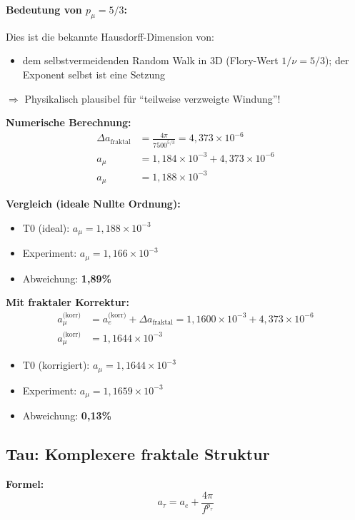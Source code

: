 	\textbf{Bedeutung von $p_\mu = 5/3$:}
	
	Dies ist die bekannte Hausdorff-Dimension von:
	\begin{itemize}
		\item dem selbstvermeidenden Random Walk in 3D (Flory-Wert $1/\nu = 5/3$); der Exponent selbst ist eine Setzung
	\end{itemize}
	
	$\Rightarrow$ Physikalisch plausibel für ``teilweise verzweigte Windung''!
	
	\textbf{Numerische Berechnung:}
	\begin{align}
		\Delta a_{\text{fraktal}} &= \frac{4\pi}{7500^{5/3}} = 4{,}373 \times 10^{-6} \\
		a_\mu &= 1{,}184 \times 10^{-3} + 4{,}373 \times 10^{-6} \\
		a_\mu &= 1{,}188 \times 10^{-3}
	\end{align}
	
	\textbf{Vergleich (ideale Nullte Ordnung):}
	\begin{itemize}
		\item T0 (ideal): $a_\mu = 1{,}188 \times 10^{-3}$
		\item Experiment: $a_\mu = 1{,}166 \times 10^{-3}$
		\item Abweichung: \textbf{1{,}89\%}
	\end{itemize}
	
	\textbf{Mit fraktaler Korrektur:}
	\begin{align}
		a_\mu^\text{(korr)} &= a_e^\text{(korr)} + \Delta a_\text{fraktal} = 1{,}1600 \times 10^{-3} + 4{,}373 \times 10^{-6} \\
		a_\mu^\text{(korr)} &= 1{,}1644 \times 10^{-3}
	\end{align}
	\begin{itemize}
		\item T0 (korrigiert): $a_\mu = 1{,}1644 \times 10^{-3}$
		\item Experiment: $a_\mu = 1{,}1659 \times 10^{-3}$
		\item Abweichung: \textbf{0{,}13\%}
	\end{itemize}
	
	\subsection{Tau: Komplexere fraktale Struktur}
	
	\textbf{Formel:}
	\begin{equation}
		a_\tau = a_e + \frac{4\pi}{f^{p_\tau}}
		\label{eq:atau}
	\end{equation}
	
